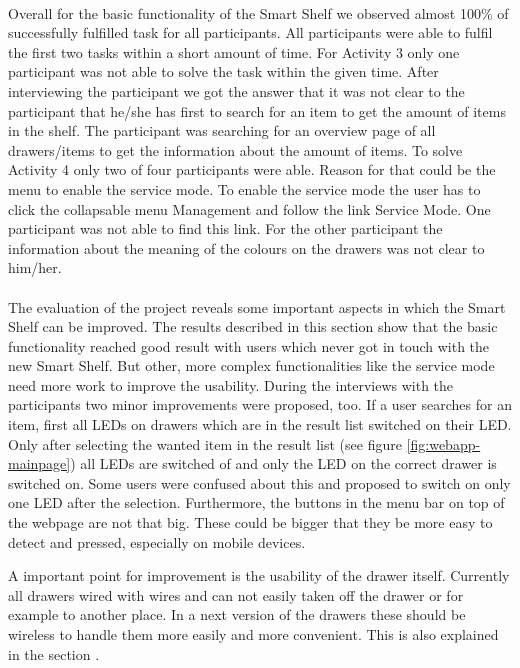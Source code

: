 \\
Overall for the basic functionality of the Smart Shelf we observed almost 100\% of successfully fulfilled task for all participants. 
All participants were able to fulfil the first two tasks within a short amount of time. 
For Activity 3 only one participant was not able to solve the task within the given time. 
After interviewing the participant we got the answer that it was not clear to the participant that he/she has first to search for an item to get the amount of items in the shelf. 
The participant was searching for an overview page of all drawers/items to get the information about the amount of items. 
To solve Activity 4 only two of four participants were able. 
Reason for that could be the menu to enable the service mode. 
To enable the service mode the user has to click the collapsable menu \grqq{}Management\grqq{} and follow the link \grqq{}Service Mode\grqq{}. 
One participant was not able to find this link. 
For the other participant the information about the meaning of the colours on the drawers was not clear to him/her. 
\\
\\
The evaluation of the project reveals some important aspects in which the Smart Shelf can be improved. 
The results described in this section show that the basic functionality reached good result with users which never got in touch with the new Smart Shelf. 
But other, more complex functionalities like the service mode need more work to improve the usability. 
During the interviews with the participants two minor improvements were proposed, too. 
If a user searches for an item, first all LEDs on drawers which are in the result list switched on their LED. 
Only after selecting the wanted item in the result list (see figure \ref{fig:webapp-mainpage}) all LEDs are switched of and only the LED on the correct drawer is switched on. 
Some users were confused about this and proposed to switch on only one LED after the selection. 
Furthermore, the buttons in the menu bar on top of the webpage are not that big. 
These could be bigger that they be more easy to detect and pressed, especially on mobile devices. 

A important point for improvement is the usability of the drawer itself. 
Currently all drawers wired with wires and can not easily taken off the drawer or for example to another place. 
In a next version of the drawers these should be wireless to handle them more easily and more convenient. 
This is also explained in the section .
